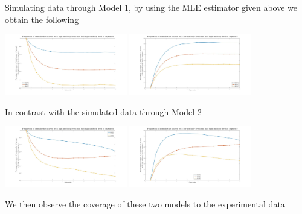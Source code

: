 \documentclass[11pt,letterpaper]{amsart}
\theoremstyle{plain}
\theoremstyle{definition}
\theoremstyle{remark}
\begin{document}
Simulating data through Model 1, by using the MLE estimator given above we obtain the following
\begin{center}
\includegraphics[width=0.4\textwidth]{fig1.jpg}
\includegraphics[width=0.4\textwidth]{fig2.jpg}
\end{center}
In contrast with the simulated data through Model 2
\begin{center}
\includegraphics[width=0.4\textwidth]{fig3.jpg}
\includegraphics[width=0.4\textwidth]{fig4.jpg}
\end{center}
We then observe the coverage of these two models to the experimental data
\end{document}
